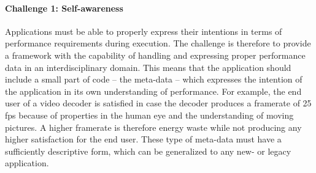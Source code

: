 \documentclass{article}
\begin{document}
\paragraph{Challenge 1: Self-awareness}
\label{sec:self}
Applications must be able to properly express their intentions in terms of performance requirements during execution. 
The challenge is therefore to provide a framework with the capability of handling and expressing proper performance data in an interdisciplinary domain.
This means that the application should include a small part of code -- the meta-data -- which expresses the intention of the application in its own understanding of performance.
For example, the end user of a video decoder is satisfied in case the decoder produces a framerate of 25 fps because of properties in the human eye and the understanding of moving pictures. 
A higher framerate is therefore energy waste while not producing any higher satisfaction for the end user.
These type of meta-data must have a sufficiently descriptive form, which can be generalized to any new- or legacy application.
\end{document}
